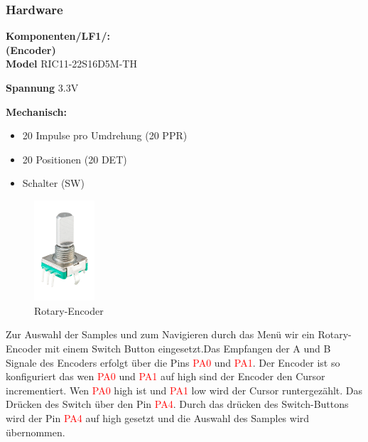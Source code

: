 \subsubsection{Hardware}

\textbf{Komponenten/LF1/:} \\


\textbf{(Encoder)} \\

\textbf{Model} RIC11-22S16D5M-TH

\textbf{Spannung} 3.3V

\textbf{Mechanisch:}
\begin{itemize}
	\item 20 Impulse pro Umdrehung (20 PPR)
	\item 20 Positionen (20 DET)
	\item Schalter (SW)
\end{itemize} 

	\begin{figure} %
	\vspace{-250pt + 0.02\textwidth}
	\hspace{0.07\textwidth} %
	\includegraphics[width=0.2\textwidth]{images/05_technische_spezifikation/Interface/Encoder.png} %
	\caption{Rotary-Encoder}
	\label{fig:rotary_encoder}
	\vspace{-20pt}
\end{figure}

Zur Auswahl der Samples und zum Navigieren durch das Menü wir ein Rotary-Encoder mit einem Switch Button eingesetzt.Das Empfangen der A und B Signale des Encoders erfolgt über die Pins \textcolor{red}{PA0} und \textcolor{red}{PA1}. Der Encoder ist so konfiguriert das wen \textcolor{red}{PA0} und \textcolor{red}{PA1} auf high sind der Encoder den Cursor incrementiert. Wen \textcolor{red}{PA0} high ist und \textcolor{red}{PA1} low wird der Cursor runtergezählt.
Das Drücken des Switch über den Pin \textcolor{red}{PA4}. Durch das drücken des Switch-Buttons wird der Pin \textcolor{red}{PA4} auf high gesetzt und die Auswahl des Samples wird übernommen.

